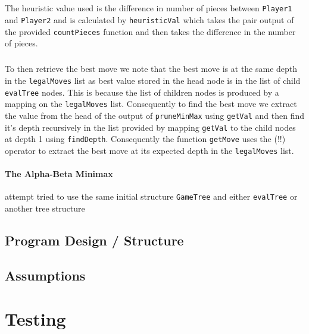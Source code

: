 \documentclass[11pt]{article}
\begin{document}
\subparagraph*{}The heuristic value used is the difference in number of pieces between \verb|Player1| and \verb|Player2| and is calculated by \verb|heuristicVal| which takes the pair output of the provided \verb|countPieces| function and then takes the difference in the number of pieces.

\subparagraph*{}To then retrieve the best move we note that the best move is at the same depth in the \verb|legalMoves| list as best value stored in the head node is in the list of child \verb|evalTree| nodes. This is because the list of children nodes is produced by a mapping on the \verb|legalMoves| list. Consequently to find the best move we extract the value from the head of the output of \verb|pruneMinMax| using \verb|getVal| and then find it's depth recursively in the list provided by mapping \verb|getVal| to the child nodes at depth 1 using \verb|findDepth|. Consequently the function \verb|getMove| uses the (!!) operator to extract the best move at its expected depth in the \verb|legalMoves| list.


\paragraph{The Alpha-Beta Minimax} attempt tried to use the same initial structure \verb|GameTree| and either \verb|evalTree| or another tree structure


\newpage
\subsection{Program Design / Structure}


 \subsection{Assumptions}%



\section{Testing}%
\end{document}
